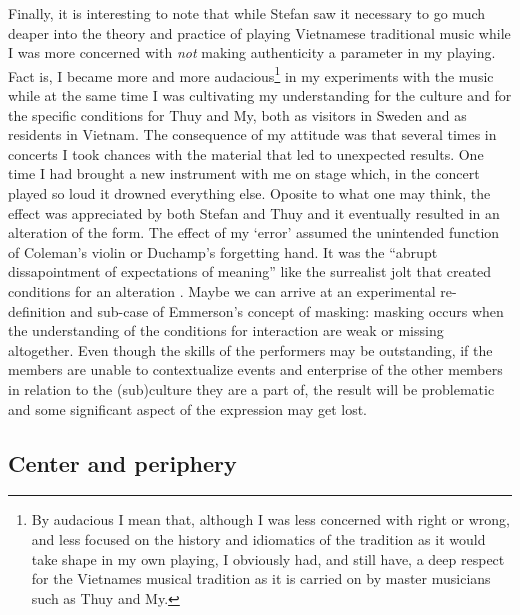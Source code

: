 \documentclass[a4paper]{article}
\begin{document}
Finally, it is interesting to note that while Stefan saw it necessary to go much deaper into the theory and practice of playing Vietnamese traditional music while I was more concerned with \emph{not} making authenticity a parameter in my playing. Fact is, I became more and more audacious\footnote{By audacious I mean that, although I was less concerned with right or wrong, and less focused on the history and idiomatics of the tradition as it would take shape in my own playing, I obviously had, and still have, a deep respect for the Vietnames musical tradition as it is carried on by master musicians such as Thuy and My.} in my experiments with the music while at the same time I was cultivating my understanding for the culture and for the specific conditions for Thuy and My, both as visitors in Sweden and as residents in Vietnam. The consequence of my attitude was that several times in concerts I took chances with the material that led to unexpected results. One time I had brought a new instrument with me on stage which, in the concert played so loud it drowned everything else. Oposite to what one may think, the effect was appreciated by both Stefan and Thuy and it eventually resulted in an alteration of the form. The effect of my `error' assumed the unintended function of Coleman's violin or Duchamp's forgetting hand. It was the ``abrupt dissapointment of expectations of meaning'' like the surrealist jolt that created conditions for an alteration \citep{barthes68:death_of}. Maybe we can arrive at an experimental re-definition and sub-case of Emmerson's concept of masking: masking occurs when the understanding of the conditions for interaction are weak or missing altogether. Even though the skills of the performers may be outstanding, if the members are unable to contextualize events and enterprise of the other members in relation to the (sub)culture they are a part of, the result will be problematic and some significant aspect of the expression may get lost. 


\subsection{Center and periphery}
\label{sec:center-periphery}
\end{document}
